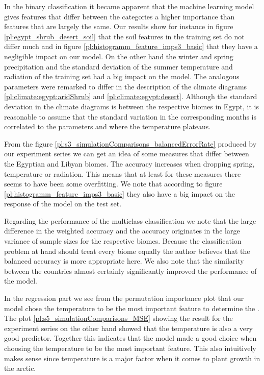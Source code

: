 In the binary classification it became apparent that the machine learning model gives features that differ between the
categories a higher importance than features that are largely the same.
Our results show for instance in figure \ref{pl:egypt_shrub_desert_soil} that the soil features in the training set do not differ much and in figure
\ref{pl:histogramm_feature_imps3_basic} that they have a negligible impact on our model. On the other hand the winter and spring precipitation and the standard deviation of the summer temperature
and radiation of the training set had a big 
impact on the model. The analogous parameters were remarked to differ in the description of the
climate diagrams \ref{pl:climate:egypt:aridShrub} and \ref{pl:climate:egypt:desert}.
Although the standard deviation in the climate diagrams is between the respective biomes in Egypt, it is reasonable to assume that
the standard variation in the corresponding months is correlated to the parameters  and  where the
temperature plateaus.

From the figure \ref{pl:s3_simulationComparisons_balancedErrorRate} produced by our experiment series 
we can get an idea of some measures that differ between the Egyptian and Libyan biomes. The accuracy 
increases when dropping spring, temperature or radiation. This means that at least for these measures there seems to have been some overfitting.
We note that according to figure \ref{pl:histogramm_feature_imps3_basic} they also have a big impact on the response of the model on the test set.

Regarding the performance of the multiclass classification we note that the large difference in the weighted accuracy and the accuracy
originates in the large variance of sample sizes for the respective biomes.
Because the classification problem at hand should treat every biome
equally the author believes that the balanced accuracy is more appropriate here.
We also note that the similarity between the countries almost certainly significantly improved the
performance of the model.

In the regression part we see from the permutation importance plot that our model chose the temperature to be the most important feature to determine the
. The plot \ref{pl:s5_simulationComparisons_MSE} showing the result for the experiment series on the other hand showed that the temperature is also a very good predictor.
Together this indicates that the model made a good choice when choosing the temperature to be the most important feature.
This also intuitively makes sense since temperature is a major factor when it comes to plant growth in the arctic.

